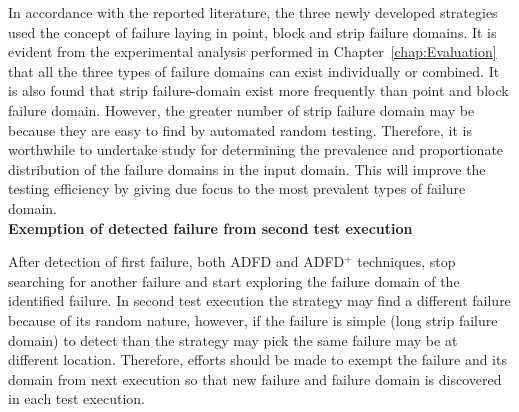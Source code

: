 In accordance with the reported literature, the three newly developed strategies used the concept of failure laying in point, block and strip failure domains. It is evident from the experimental analysis performed in Chapter~\ref{chap:Evaluation} that all the three types of failure domains can exist individually or combined. It is also found that strip failure-domain exist more frequently than point and block failure domain. However, the greater number of strip failure domain may be because they are easy to find by automated random testing. Therefore, it is worthwhile to undertake study for determining the prevalence and proportionate distribution of the failure domains in the input domain. This will improve the testing efficiency by giving due focus to the most prevalent types of failure domain.  \\



\textbf{Exemption of detected failure from second test execution}

After detection of first failure, both ADFD and ADFD$^+$ techniques, stop searching for another failure and start exploring the failure domain of the identified failure. In second test execution the strategy may find a different failure because of its random nature, however, if the failure is simple (long strip failure domain) to detect than the strategy may pick the same failure may be at different location. Therefore, efforts should be made to exempt the failure and its domain from next execution so that new failure and failure domain is discovered in each test execution.\\





